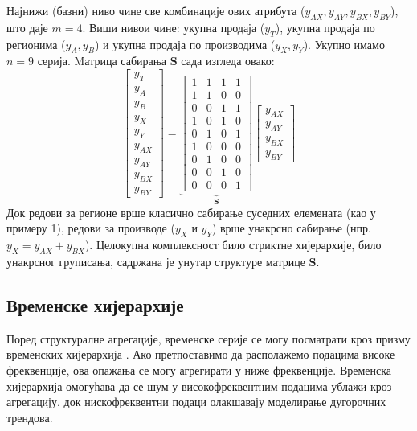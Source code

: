 \documentclass[12pt,oneside]{memoir}
\begin{document}
Најнижи (базни) ниво чине све комбинације ових атрибута ($y_{AX}, y_{AY}, y_{BX}, y_{BY}$), што даје $m=4$. Виши нивои чине: укупна продаја ($y_T$), укупна продаја по регионима ($y_A, y_B$) и укупна продаја по производима ($y_X, y_Y$). Укупно имамо $n=9$ серија. Mатрица сабирања $\mathbf{S}$ сада изгледа овако:
\begin{equation}
    \begin{bmatrix} 
    y_T \\ \hline
    y_A \\ 
    y_B \\ \hline
    y_X \\
    y_Y \\ \hline
    y_{AX} \\
    y_{AY} \\
    y_{BX} \\
    y_{BY}
    \end{bmatrix} 
    = 
    \underbrace{
    \begin{bmatrix} 
    1 & 1 & 1 & 1 \\ \hline
    1 & 1 & 0 & 0 \\ 
    0 & 0 & 1 & 1 \\ \hline
    1 & 0 & 1 & 0 \\
    0 & 1 & 0 & 1 \\ \hline
    1 & 0 & 0 & 0 \\
    0 & 1 & 0 & 0 \\
    0 & 0 & 1 & 0 \\
    0 & 0 & 0 & 1 
    \end{bmatrix}
    }_{\mathbf{S}}
    \begin{bmatrix} 
    y_{AX} \\ 
    y_{AY} \\
    y_{BX} \\
    y_{BY}
    \end{bmatrix}
\end{equation}
Док редови за регионе врше класично сабирање суседних елемената (као у примеру 1), редови за производе ($y_X$ и $y_Y$) врше унакрсно сабирање (нпр. $y_X = y_{AX} + y_{BX}$). Целокупна комплексност било стриктне хијерархије, било унакрсног груписања, садржана је унутар структуре матрице $\mathbf{S}$.

\subsection{Временске хијерархије}

Поред структуралне агрегације, временске серије се могу посматрати кроз призму временских хијерархија \cite{athanasopoulos2017forecasting}. Ако претпоставимо да располажемо подацима високе фреквенције, ова опажања се могу агрегирати у ниже фреквенције. Временска хијерархија омогућава да се шум у високофреквентним подацима ублажи кроз агрегацију, док нискофреквентни подаци олакшавају моделирање дугорочних трендова. 
\end{document}

